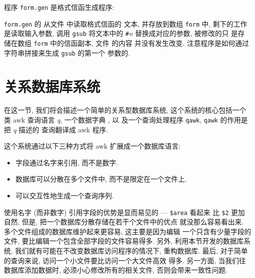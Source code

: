程序 \verb'form.gen' 是格式信函生成程序:

\verb'form.gen' 的 \BEGIN 从文件  中读取格式信函的
文本, 并存放到数组 \verb'form' 中, 剩下的工作是读取输入参数, 调用 
\verb'gsub' 将文本中的 \verb'#'\textit{n} 替换成对应的参数, 被修改的只 
是存储在数组 \verb'form' 中的信函副本, 文件  的内容
并没有发生改变. 注意程序是如何通过字符串拼接来生成 \verb'gsub' 的第一个
参数的.

\section{关系数据库系统}
\label{sec:a_relational_database_system}

在这一节, 我们将会描述一个简单的关系型数据库系统, 这个系统的核心包括一个
类 awk 查询语言 \textit{q}, 一个数据字典 , 以
及一个查询处理程序 \verb'qawk', \verb'qawk' 的作用是把 \textit{q} 描述的
查询翻译成 awk 程序.

这个系统通过以下三种方式将 awk 扩展成一个数据库语言:
\begin{itemize}
    \item 字段通过名字来引用, 而不是数字.
    \item 数据库可以分散在多个文件中, 而不是限定在一个文件上.
    \item 可以交互性地生成一个查询序列.
\end{itemize}
使用名字 (而非数字) 引用字段的优势是显而易见的 --- \verb'$area' 看起来
比 \verb'$2' 更加自然, 但是, 把一个数据库分散存储在若干个文件中的优点
就没那么容易看出来. 多个文件组成的数据库维护起来更容易, 这主要是因为编辑
一个只含有少量字段的文件, 要比编辑一个包含全部字段的文件容易得多. 另外,
利用本节开发的数据库系统, 我们就有可能在不改变数据库访问程序的情况下,
重构数据库. 最后, 对于简单的查询来说, 访问一个小文件要比访问一个大文件高效
得多. 另一方面, 当我们往数据库添加数据时, 必须小心修改所有的相关文件, 
否则会带来一致性问题.

